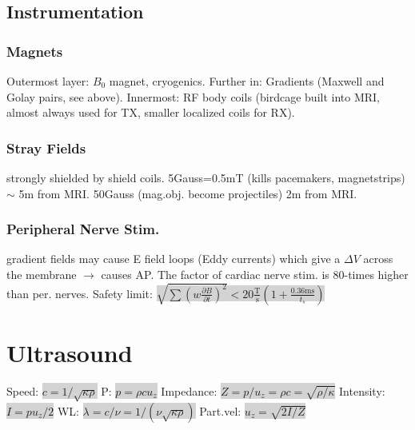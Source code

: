 \documentclass[9pt]{article}
\newcommand{\grey}[1]{\setlength{\fboxsep}{0pt}\colorbox{lightgrey}{#1}}
\newcommand{\del}{\partial}
\begin{document}
\begin{multicols}{2}
\subsection{Instrumentation}
\subsubsection{Magnets}
Outermost layer: $B_0$ magnet, cryogenics. Further in: Gradients (Maxwell and Golay pairs, see above). Innermost: RF body coils (birdcage built into MRI, almost always used for TX, smaller localized coils for RX).

\subsubsection{Stray Fields}
strongly shielded by shield coils. 5Gauss=0.5mT (kills pacemakers, magnetstrips) $\sim$ 5m from MRI. 50Gauss (mag.obj. become projectiles) 2m from MRI.

\subsubsection{Peripheral Nerve Stim.} gradient fields may cause E field loops (Eddy currents) which give a $\Delta V$ across the membrane $\rightarrow$ causes AP. The factor of cardiac nerve stim. is 80-times higher than per. nerves. Safety limit: \grey{$\sqrt{\sum (w \frac{\del B}{\del t})^2} < 20 \mathrm{\frac{T}{s}}(1 + \frac{0.36\mathrm{ms}}{t_s})$}
\vspace{-2mm}
\section{Ultrasound}
\vspace{-2mm}
Speed: \grey{$c = 1/\sqrt{\kappa\rho}$} P: \grey{$p = \rho c u_z$}
Impedance: \grey{$Z = p/u_z = \rho c = \sqrt{\rho/\kappa}$} Intensity: \grey{$I = p u_z/2$} WL: \grey{$\lambda = {c/\nu} = {1/(\nu \sqrt{\kappa \rho})}$} Part.vel: \grey{$u_z=\sqrt{2I/Z}$}


\end{multicols}
\end{document}
